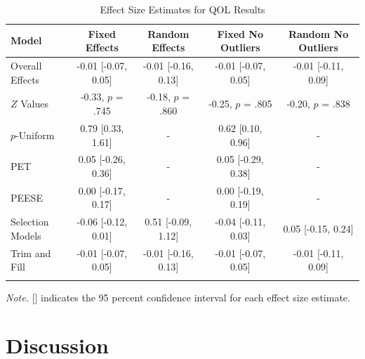 \documentclass[man]{apa6}
\theoremstyle{definition}
\theoremstyle{definition}
\theoremstyle{definition}
\theoremstyle{remark}
\begin{document}
\begin{table}[tbp]
\begin{center}
\begin{threeparttable}
\caption{\label{tab:QOLtable}Effect Size Estimates for QOL Results}
\small{
\begin{tabular}{lcccc}
\toprule
Model & Fixed Effects & Random Effects & Fixed No Outliers & Random No Outliers\\
\midrule
Overall Effects & -0.01 [-0.07, 0.05] & -0.01 [-0.16, 0.13] & -0.01 [-0.07, 0.05] & -0.01 [-0.11, 0.09]\\
$Z$ Values & -0.33, $p$ = .745 & -0.18, $p$ = .860 & -0.25, $p$ = .805 & -0.20, $p$ = .838\\
$p$-Uniform & 0.79 [0.33, 1.61] & - & 0.62 [0.10, 0.96] & -\\
PET & 0.05 [-0.26, 0.36] & - & 0.05 [-0.29, 0.38] & -\\
PEESE & 0.00 [-0.17, 0.17] & - & 0.00 [-0.19, 0.19] & -\\
Selection Models & -0.06 [-0.12, 0.01] & 0.51 [-0.09, 1.12] & -0.04 [-0.11, 0.03] & 0.05 [-0.15, 0.24]\\
Trim and Fill & -0.01 [-0.07, 0.05] & -0.01 [-0.16, 0.13] & -0.01 [-0.07, 0.05] & -0.01 [-0.11, 0.09]\\
\bottomrule
\addlinespace
\end{tabular}
}
\begin{tablenotes}[para]
\textit{Note.} [] indicates the 95 percent confidence interval for each effect size estimate.
\end{tablenotes}
\end{threeparttable}
\end{center}
\end{table}

\section{Discussion}\label{discussion}
\end{document}
